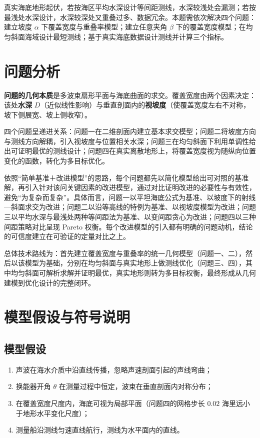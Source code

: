 \documentclass[12pt]{ctexart}
\begin{document}
真实海底地形起伏，若按海区平均水深设计等间距测线，水深较浅处会漏测；若按最浅处水深设计，水深较深处又重叠过多、数据冗余。本题需依次解决四个问题：建立坡度 $\alpha$ 下覆盖宽度与重叠率模型；建立任意夹角 $\beta$ 下的覆盖宽度模型；在均匀斜面海域设计最短测线；基于真实海底数据设计测线并计算三个指标。

\section{问题分析}

\textbf{问题的几何本质}是多波束扇形平面与海底曲面的求交。覆盖宽度由两个因素决定：该处\textbf{水深} $D$（近似线性影响）与垂直剖面内的\textbf{视坡度}（使覆盖宽度左右不对称，坡下侧展宽、坡上侧收窄）。

四个问题呈递进关系：问题一在二维剖面内建立基本求交模型；问题二将坡度方向与测线方向解耦，引入视坡度与位置相关水深；问题三在均匀斜面下利用单调性给出可证明最优的测线设计；问题四在真实离散地形上，将覆盖宽度视为随纵向位置变化的函数，转化为多目标优化。

依照``简单基准＋改进模型''的思路，每个问题都先以简化模型给出可对照的基准解，再引入针对该问关键因素的改进模型，通过对比证明改进的必要性与有效性，避免``为复杂而复杂''。具体而言，问题一以平坦海底公式为基准、以坡度下的射线—斜面求交为改进；问题二以沿等高线的特例为基准、以视坡度模型为改进；问题三以平均水深与最浅处两种等间距法为基准、以变间距贪心为改进；问题四以三种间距策略对比呈现 Pareto 权衡。每个改进模型的引入都有明确的问题动机，结论的可信度建立在可验证的定量对比之上。

总体技术路线为：首先建立覆盖宽度与重叠率的统一几何模型（问题一、二），然后以该模型为基础，分别在均匀斜面与真实地形上做测线优化（问题三、四），其中均匀斜面可解析求解并证明最优，真实地形则转为多目标权衡，最终形成从几何建模到优化设计的完整闭环。

\section{模型假设与符号说明}

\subsection{模型假设}
\begin{enumerate}[label=(\arabic*)]
\item 声波在海水介质中沿直线传播，忽略声速剖面引起的声线弯曲；
\item 换能器开角 $\theta$ 在测量过程中恒定，波束在垂直剖面内对称分布；
\item 在覆盖宽度尺度内，海底可视为局部平面（问题四的网格步长 $0.02$ 海里远小于地形水平变化尺度）；
\item 测量船沿测线匀速直线航行，测线为水平面内的直线。
\end{enumerate}
\end{document}
